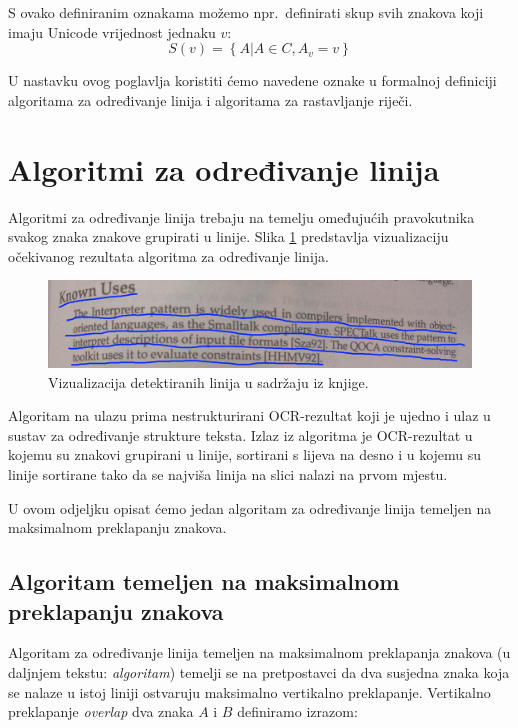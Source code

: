 \documentclass[times, utf8, zavrsni]{fer}
\begin{document}
S ovako definiranim oznakama možemo npr.\ definirati skup svih znakova koji
imaju Unicode vrijednost jednaku $v$:
\[ S(v) = \left\{A \vert A \in C, A_v = v\right\} \]

U nastavku ovog poglavlja koristiti ćemo navedene oznake u formalnoj definiciji
algoritama za određivanje linija i algoritama za rastavljanje riječi.








\section{Algoritmi za određivanje linija}
\label{sec:algoritmi-za-odredivanje-linija}
Algoritmi za određivanje linija trebaju na temelju omeđujućih pravokutnika
svakog znaka znakove grupirati u linije. Slika \ref{fig:line-semgentation-01}
predstavlja vizualizaciju očekivanog rezultata algoritma za određivanje linija.

\begin{figure}[htb]
    \centering
    \captionsetup{justification=centering,margin=2cm}
    \includegraphics[width=\textwidth]{images/line-segmentation-01.jpg}
    \caption{
        Vizualizacija detektiranih linija u sadržaju iz knjige.
    }
    \label{fig:line-semgentation-01}
\end{figure}

Algoritam na ulazu prima nestrukturirani OCR-rezultat koji je ujedno i ulaz u
sustav za određivanje strukture teksta. Izlaz iz algoritma je OCR-rezultat u
kojemu su znakovi grupirani u linije, sortirani s lijeva na desno i u kojemu
su linije sortirane tako da se najviša linija na slici nalazi na prvom mjestu.

U ovom odjeljku opisat ćemo jedan algoritam za određivanje linija temeljen
na maksimalnom preklapanju znakova.



\subsection{Algoritam temeljen na maksimalnom preklapanju znakova}
Algoritam za određivanje linija temeljen na maksimalnom preklapanja znakova
(u daljnjem tekstu: \emph{algoritam}) temelji se na pretpostavci da dva susjedna
znaka koja se nalaze u istoj liniji ostvaruju maksimalno vertikalno preklapanje.
Vertikalno preklapanje \textit{overlap} dva znaka $A$ i $B$ definiramo izrazom:
\end{document}
